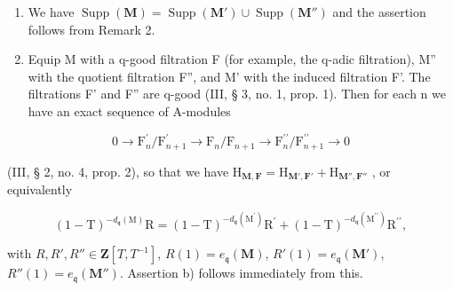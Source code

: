 \begin{enumerate}
\def\labelenumi{\alph{enumi})}
\item
  We have \(\operatorname{Supp}(\mathbf{M}) = \operatorname{Supp}(\mathbf{M}') \cup \operatorname{Supp}(\mathbf{M}'')\) and the assertion follows from Remark 2.
\item
  Equip M with a q-good filtration F (for example, the q-adic filtration), M'' with the quotient filtration F'', and M' with the induced filtration F'. The filtrations F' and F'' are q-good (III, § 3, no. 1, prop. 1). Then for each n we have an exact sequence of A-modules
\end{enumerate}

\[
0 \rightarrow \mathrm{F} _ {n} ^ {\prime} / \mathrm{F} _ {n + 1} ^ {\prime} \rightarrow \mathrm{F} _ {n} / \mathrm{F} _ {n + 1} \rightarrow \mathrm{F} _ {n} ^ {\prime \prime} / \mathrm{F} _ {n + 1} ^ {\prime \prime} \rightarrow 0
\]

(III, § 2, no. 4, prop. 2), so that we have \(\mathrm{H}_{\mathbf{M},\mathbf{F}} = \mathrm{H}_{\mathbf{M}',\mathbf{F}'} + \mathrm{H}_{\mathbf{M}'',\mathbf{F}''}\) , or equivalently

\[
(1 - \mathrm{T}) ^ {- d _ {\mathfrak {q}} (\mathrm{M})} \mathrm{R} = (1 - \mathrm{T}) ^ {- d _ {\mathfrak {q}} (\mathrm{M} ^ {\prime})} \mathrm{R} ^ {\prime} + (1 - \mathrm{T}) ^ {- d _ {\mathfrak {q}} (\mathrm{M} ^ {\prime \prime})} \mathrm{R} ^ {\prime \prime},
\]

with \(R,R',R''\in\mathbf{Z}[T,T^{-1}]\), \(R(1)=e_{\mathfrak{q}}(\mathbf{M})\), \(R'(1)=e_{\mathfrak{q}}(\mathbf{M}')\), \(R''(1)=e_{\mathfrak{q}}(\mathbf{M}'')\). Assertion b) follows immediately from this.

